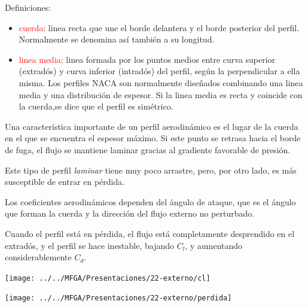 	Definiciones: 
	\begin{itemize}
		\item \textcolor{red}{cuerda}: linea recta que une el borde delantera y
		el borde posterior del perfil. Normalmente se denomina así también
		a su longitud. 
		\item \textcolor{red}{linea media}: linea formada por los puntos medios
		entre curva superior (extradós) y curva inferior (intradós) del perfil,
		según la perpendicular a ella misma. Los perfiles NACA son normalmente
		diseñados combinando una linea media y una distribución de espesor.
		Si la linea media es recta y coincide con la cuerda,se dice que el
		perfil es simétrico. 
	\end{itemize}

	
	Una característica importante de un perfil aerodinámico es el lugar
	de la cuerda en el que se encuentra el espesor máximo. Si este punto
	se retrasa hacia el borde de fuga, el flujo se mantiene laminar gracias
	al gradiente favorable de presión.
	
	Este tipo de perfil  \textit{laminar} tiene muy
	poco arrastre, pero, por otro lado, es más susceptible de entrar en
	pérdida.
	
	Los coeficientes aerodinámicos dependen del ángulo de ataque, que
	es el ángulo que forman la cuerda y la dirección del flujo externo
	no perturbado.
	
	Cuando el perfil está en pérdida, el flujo está completamente desprendido
	en el extradós, y el perfil se hace inestable, bajando $C_{l}$, y
	aumentando considerablemente $C_{d}$. 

\begin{center}
	\texttt{[image: ../../MFGA/Presentaciones/22-externo/cl]}
\end{center}

\begin{center}
	\texttt{[image: ../../MFGA/Presentaciones/22-externo/perdida]}
\end{center}
	

